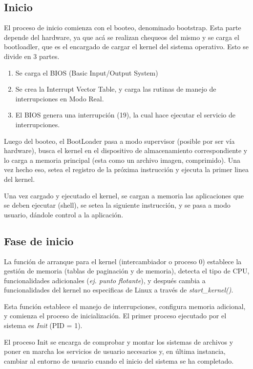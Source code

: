 \documentclass[titlepage,a4paper]{article}
\begin{document}
\subsection*{Inicio}
El proceso de inicio comienza con el booteo, denominado bootstrap. Esta parte depende del hardware, ya que acá se realizan chequeos del mismo y se carga el bootloadler, que es el encargado de cargar el kernel del sistema operativo. Esto se divide en 3 partes.
\begin{enumerate}
    \item Se carga el BIOS (Basic Input/Output System)
    \item Se crea la Interrupt Vector Table, y carga las rutinas de manejo de interrupciones en Modo Real.
    \item El BIOS genera una interrupción (19), la cual hace ejecutar el servicio de interrupciones.
\end{enumerate}

Luego del booteo, el BootLoader pasa a modo supervisor (posible por ser vía hardware), busca el kernel en el dispositivo de almacenamiento correspondiente y lo carga a memoria principal (esta como un archivo imagen, comprimido). Una vez hecho eso, setea el registro de la próxima instrucción y ejecuta la primer linea del kernel.

Una vez cargado y ejecutado el kernel, se cargan a memoria las aplicaciones que se deben ejecutar (shell), se setea la siguiente instrucción, y se pasa a modo usuario, dándole control a la aplicación.

\subsection*{Fase de inicio}
La función de arranque para el kernel (intercambiador o proceso 0) establece la gestión de memoria (tablas de paginación y de memoria), detecta el tipo de CPU, funcionalidades adicionales (\textit{ej. punto flotante}), y después cambia a funcionalidades del kernel no especificas de Linux a través de \textit{start\_kernel()}.

Esta función establece el manejo de interrupciones, configura memoria adicional, y comienza el proceso de inicialización. El primer proceso ejecutado por el sistema es \textit{Init} (PID = 1).

El proceso Init se encarga de comprobar y montar los sistemas de archivos y poner en marcha los servicios de usuario necesarios y, en última instancia, cambiar al entorno de usuario cuando el inicio del sistema se ha completado.
\end{document}
